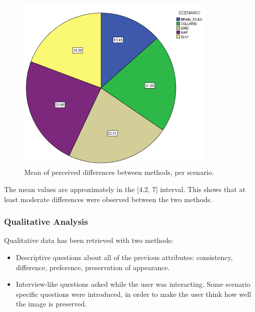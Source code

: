 \documentclass[]{article}
\begin{document}
\begin{figure}[!h]
    \centering
    \includegraphics[width=0.85\textwidth]{figures/results/DifferenceChart.PNG}
    \caption{Mean of perceived differences between methods, per scenario.}
    \label{fig:DifferenceChart}
\end{figure}

The mean values are approximately in the [4.2, 7] interval. This shows that at least moderate differences were observed between the two methods.

\subsubsection{Qualitative Analysis}

Qualitative data has been retrieved with two methods: 
\begin{itemize}[noitemsep,topsep=0pt]
\item Descriptive questions about all of the previous attributes: consistency, difference, preference, preservation of appearance.
\item Interview-like questions asked while the user was interacting. Some scenario specific questions were introduced, in order to make the user think how well the image is preserved.
\end{itemize} 
\end{document}
